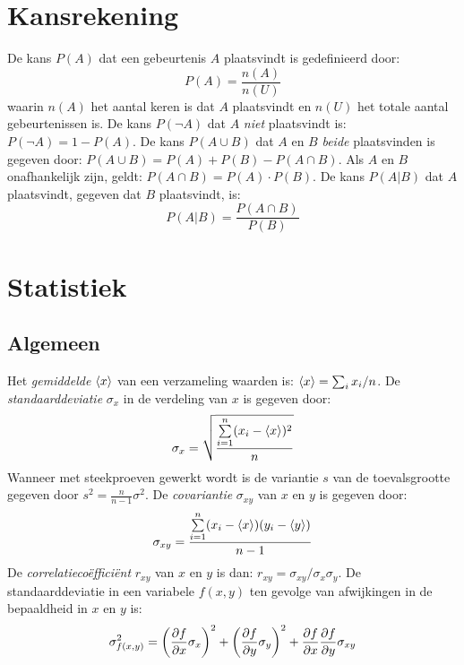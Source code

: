 \documentclass[twoside]{report}
\begin{document}
\section{Kansrekening}
De kans $P(A)$ dat een gebeurtenis $A$ plaatsvindt is gedefinieerd door:
\[
P(A)=\frac{n(A)}{n(U)}
\]
waarin $n(A)$ het aantal keren is dat $A$ plaatsvindt en $n(U)$ het totale
aantal gebeurtenissen is.
\npar
De kans $P(\neg A)$ dat $A$ {\it niet} plaatsvindt is: $P(\neg A)=1-P(A)$.
De kans $P(A\cup B)$ dat $A$ en $B$ {\it beide} plaatsvinden is gegeven door:
$P(A\cup B)=P(A)+P(B)-P(A\cap B)$. Als $A$ en $B$ onafhankelijk zijn, geldt:
$P(A\cap B)=P(A)\cdot P(B)$.
\npar
De kans $P(A|B)$ dat $A$ plaatsvindt, gegeven dat $B$ plaatsvindt, is:
\[
P(A|B)=\frac{P(A\cap B)}{P(B)}
\]

\section{Statistiek}
\subsection{Algemeen}
Het {\it gemiddelde} $\left\langle x \right\rangle$ van een verzameling waarden is: $\left\langle x \right\rangle=\sum_i x_i/n$.
De {\it standaarddeviatie} $\sigma_x$ in de verdeling van $x$ is gegeven door:
\[
\sigma_x=\sqrt{\frac{\sum\limits_{i=1}^n(x_i-\left\langle x \right\rangle)^2}{n}}
\]
Wanneer met steekproeven gewerkt wordt is de variantie $s$ van de toevalsgrootte
gegeven door $\displaystyle s^2=\frac{n}{n-1}\sigma^2$.
\npar
De {\it covariantie} $\sigma_{xy}$ van $x$ en $y$ is gegeven door:
\[
\sigma_{xy}=\frac{\sum\limits_{i=1}^n(x_i-\left\langle x \right\rangle)(y_i-\left\langle y \right\rangle)}{n-1}
\]
De {\it correlatieco\"effici\"ent} $r_{xy}$ van $x$ en $y$ is dan:
$r_{xy}=\sigma_{xy}/\sigma_x\sigma_y$.
\npar
De standaarddeviatie in een variabele $f(x,y)$ ten gevolge van afwijkingen in
de bepaaldheid in $x$ en $y$ is:
\[
\sigma^2_{f(x,y)}=\left(\frac{\partial f}{\partial x}\sigma_x\right)^2+\left(\frac{\partial f}{\partial y}\sigma_y\right)^2+
\frac{\partial f}{\partial x}\frac{\partial f}{\partial y}\sigma_{xy}
\]
\end{document}
